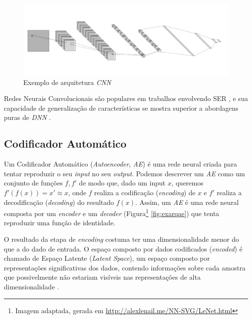 \begin{figure}[!h]
\centering
\includegraphics[width=1.0\textwidth]{imagens/ex-cnn.png} %
\caption{\label{fig:exarqcnn}Exemplo de arquitetura \textit{CNN}}
\end{figure}

Redes Neurais Convolucionais são populares em trabalhos envolvendo SER \cite{37.125} \cite{37.126} \cite{37.127} \cite{37.128}, e sua capacidade de generalização de características se mostra superior a abordagens puras de \textit{DNN} \cite{37.50}.

\subsection{Codificador Automático}

Um Codificador Automático (\textit{Autoencoder}, \textit{AE}) é uma rede neural criada para tentar reproduzir o seu \textit{input} no seu \textit{output}. Podemos descrever um \textit{AE} como um conjunto de funções $f, f'$ de modo que, dado um input $x$, queremos $f'(f(x)) = x' \approx x$, onde $f$ realiza a codificação (\textit{encoding}) de $x$ e $f'$ realiza a decodificação (\textit{decoding}) do resultado $f(x)$. Assim, um \textit{AE} é uma rede neural composta por um \textit{encoder} e um \textit{decoder} (Figura\footnote{Imagem adaptada, gerada em \url{http://alexlenail.me/NN-SVG/LeNet.html}} \ref{fig:exarqae}) que tenta reproduzir uma função de identidade.

O resultado da etapa de \textit{encoding} costuma ter uma dimensionalidade menor do que a do dado de entrada. O espaço composto por dados codificados (\textit{encoded}) é chamado de Espaço Latente (\textit{Latent Space}), um espaço composto por representações significativas dos dados, contendo informações sobre cada amostra que possivelmente não estariam visíveis nas representações de alta dimensionalidade \cite{60}.

